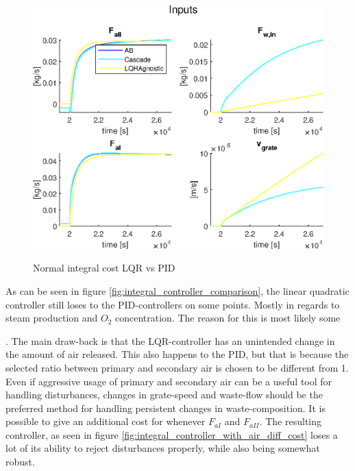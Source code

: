 \begin{figure}
    \includegraphics[width=\textwidth]{img/Fig_dump/inputs_ABCascadeLQRAgnosticStep_Q_all.eps}
    \label{fig:integral_controller_comparison_inputs}
    \caption{Normal integral cost LQR vs PID}
\end{figure}

\noindent
As can be seen in figure \ref{fig:integral_controller_comparison}, the linear quadratic controller still loses to the PID-controllers on some points. Mostly in regards to steam production and $O_2$ concentration. The reason for this is most likely some 

. The main draw-back is that the LQR-controller has an unintended change in the amount of air released. This also happens to the PID, but that is because the selected ratio between primary and secondary air is chosen to be different from 1.  Even if aggressive usage of primary and secondary air can be a useful tool for handling disturbances, changes in grate-speed and waste-flow should be the preferred method for handling persistent changes in waste-composition. It is possible to give an additional cost for whenever $F_{aI}$ and $F_{aII}$. The resulting controller, as seen in figure \ref{fig:integral_controller_with_air_diff_cost} loses a lot of its ability to reject disturbances properly, while also being somewhat robust.


